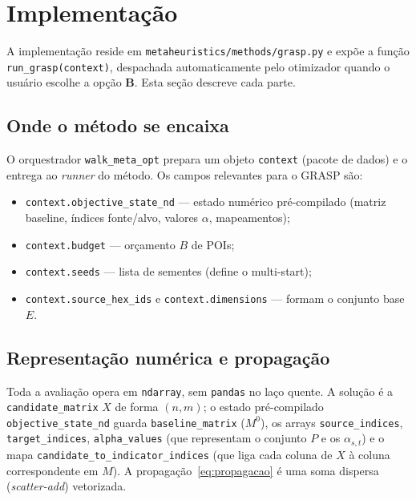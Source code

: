 \documentclass[11pt,a4paper]{article}
\begin{document}
\section{Implementação}
\label{sec:impl}

A implementação reside em \texttt{metaheuristics/methods/grasp.py} e expõe a
função \texttt{run\_grasp(context)}, despachada automaticamente pelo otimizador
quando o usuário escolhe a opção \textbf{B}. Esta seção descreve cada parte.

\subsection{Onde o método se encaixa}

O orquestrador \texttt{walk\_meta\_opt} prepara um objeto \texttt{context}
(pacote de dados) e o entrega ao \emph{runner} do método. Os campos relevantes
para o GRASP são:
\begin{itemize}\setlength\itemsep{1pt}
\item \texttt{context.objective\_state\_nd} --- estado numérico pré-compilado
(matriz baseline, índices fonte/alvo, valores $\alpha$, mapeamentos);
\item \texttt{context.budget} --- orçamento $B$ de POIs;
\item \texttt{context.seeds} --- lista de sementes (define o multi-start);
\item \texttt{context.source\_hex\_ids} e \texttt{context.dimensions} --- formam o
conjunto base $E$.
\end{itemize}

\subsection{Representação numérica e propagação}

Toda a avaliação opera em \texttt{ndarray}, sem \texttt{pandas} no laço quente.
A solução é a \texttt{candidate\_matrix} $X$ de forma $(n,m)$; o estado
pré-compilado \texttt{objective\_state\_nd} guarda \texttt{baseline\_matrix}
($M^0$), os arrays \texttt{source\_indices}, \texttt{target\_indices},
\texttt{alpha\_values} (que representam o conjunto $P$ e os $\alpha_{s,t}$) e o
mapa \texttt{candidate\_to\_indicator\_indices} (que liga cada coluna de $X$ à
coluna correspondente em $M$). A propagação~\eqref{eq:propagacao} é uma
soma dispersa (\emph{scatter-add}) vetorizada.
\end{document}
